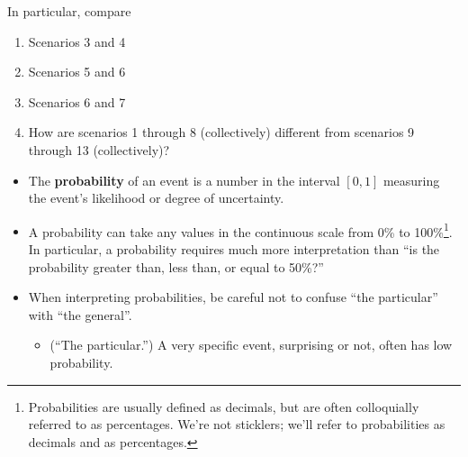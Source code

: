 \documentclass[
]{book}
\providecommand{\tightlist}{%
  \setlength{\itemsep}{0pt}\setlength{\parskip}{0pt}}
\theoremstyle{definition}
\theoremstyle{definition}
\theoremstyle{definition}
\theoremstyle{remark}
\begin{document}
In particular, compare

\begin{enumerate}
\def\labelenumi{\alph{enumi}.}
\tightlist
\item
  Scenarios 3 and 4
\item
  Scenarios 5 and 6
\item
  Scenarios 6 and 7
\item
  How are scenarios 1 through 8 (collectively) different from scenarios 9 through 13 (collectively)?
\end{enumerate}

\begin{itemize}
\tightlist
\item
  The \textbf{probability} of an event is a number in the interval \([0, 1]\) measuring the event's likelihood or degree of uncertainty.
\item
  A probability can take any values in the continuous scale from 0\% to 100\%\footnote{Probabilities are usually defined as decimals, but are often colloquially referred to as percentages. We're not sticklers; we'll refer to probabilities as decimals and as percentages.}. In particular, a probability requires much more interpretation than ``is the probability greater than, less than, or equal to 50\%?''
\item
  When interpreting probabilities, be careful not to confuse ``the particular'' with ``the general''.

  \begin{itemize}
  \tightlist
  \item
    (``The particular.'') A very specific event, surprising or not, often has low probability.


\end{itemize}
\end{itemize}
\end{document}
